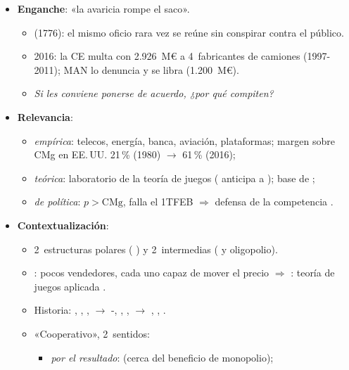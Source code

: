 \documentclass{article}
\begin{document}
\cabecerarepaso
\begin{columnas}

\begin{itemize}
\item \textbf{Enganche}: «la avaricia rompe el saco».
  \begin{itemize}
  \item {} (1776): el mismo oficio rara vez se reúne sin conspirar contra el público.
  \item 2016: la CE multa con 2.926~M€ a 4~fabricantes de camiones (1997-2011); MAN lo denuncia y se libra (1.200~M€).
  \item \emph{Si les conviene ponerse de acuerdo, ¿por qué compiten?}
  \end{itemize}
\item \textbf{Relevancia}:
  \begin{itemize}
  \item \emph{empírica}: telecos, energía, banca, aviación, plataformas; margen sobre CMg en EE.\,UU. 21\,\% (1980) $\to$ 61\,\% (2016);
  \item \emph{teórica}: laboratorio de la teoría de juegos ( anticipa a ); base de   ;
  \item \emph{de política}: $p>\mathrm{CMg}$, falla el 1TFEB  $\Rightarrow$ defensa de la competencia  .
  \end{itemize}
\item \textbf{Contextualización}:
  \begin{itemize}
  \item 2~estructuras polares ( ) y 2~intermedias ( y oligopolio).
  \item {}: pocos vendedores, cada uno capaz de mover el precio $\Rightarrow$ : teoría de juegos aplicada .
  \item Historia: , , ,  $\to$ -, , ,  $\to$ , , .
  \item «Cooperativo», 2~sentidos:
    \begin{itemize}
    \item \emph{por el resultado}:  (cerca del beneficio de monopolio);

\end{itemize}
\end{itemize}
\end{itemize}
\end{columnas}
\end{document}
